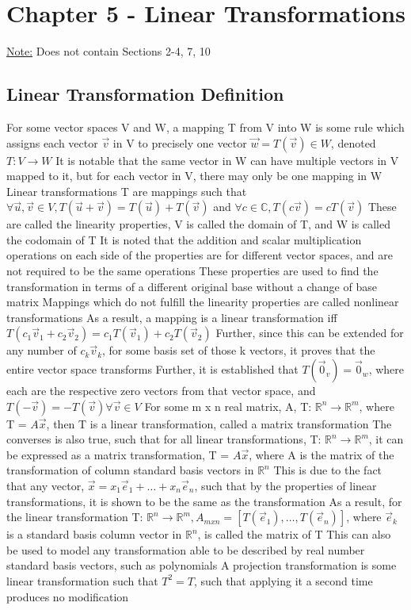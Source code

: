\documentclass[11 pt, twoside]{article}
\newenvironment{outline*}
{
	\begin{outline}[enumerate]
	}
	{\end{outline}
}
\begin{document}
\section{Chapter 5 - Linear Transformations}
\underline{Note:} Does not contain Sections 2-4, 7, 10
\subsection{Linear Transformation Definition}
\begin{outline*}
\1 For some vector spaces V and W, a mapping T from V into W is some rule which assigns each vector $\vec{v}$ in V to precisely one vector $\vec{w} = T(\vec{v}) \in W$, denoted $T: V \to W$
\2 It is notable that the same vector in W can have multiple vectors in V mapped to it, but for each vector in V, there may only be one mapping in W
\1 Linear transformations T are mappings such that $\forall \vec{u}, \vec{v} \in V, T(\vec{u} + \vec{v}) = T(\vec{u}) + T(\vec{v})$ and $\forall c \in \mathbb{C}, T(c\vec{v}) = cT(\vec{v})$
\2 These are called the linearity properties, V is called the domain of T, and W is called the codomain of T
\2 It is noted that the addition and scalar multiplication operations on each side of the properties are for different vector spaces, and are not required to be the same operations
\2 These properties are used to find the transformation in terms of a different original base without a change of base matrix
\2 Mappings which do not fulfill the linearity properties are called nonlinear transformations
\2 As a result, a mapping is a linear transformation iff $T(c_1\vec{v}_1 + c_2\vec{v}_2) = c_1T(\vec{v}_1) + c_2T(\vec{v}_2)$
\3 Further, since this can be extended for any number of $c_k\vec{v}_k$, for some basis set of those k vectors, it proves that the entire vector space transforms
\2 Further, it is established that $T(\vec{0}_v) = \vec{0}_w$, where each are the respective zero vectors from that vector space, and $T(-\vec{v}) = -T(\vec{v}) \forall \vec{v} \in V$
\1 For some m x n real matrix, A, T: $\mathbb{R}^n \to \mathbb{R}^m$, where T = $A\vec{x}$, then T is a linear transformation, called a matrix transformation
\2 The converses is also true, such that for all linear transformations, T: $\mathbb{R}^n \to \mathbb{R}^m$, it can be expressed as a matrix transformation, T = $A\vec{x}$, where A is the matrix of the transformation of column standard basis vectors in $\mathbb{R}^n$
\3 This is due to the fact that any vector, $\vec{x} = x_1\vec{e}_1 + \dots + x_n\vec{e}_n$, such that by the properties of linear transformations, it is shown to be the same as the transformation
\2 As a result, for the linear transformation T: $\mathbb{R}^n \to \mathbb{R}^m, A_{mxn} = [T(\vec{e}_1), \dots, T(\vec{e}_n)]$, where $\vec{e}_k$ is a standard basis column vector in $\mathbb{R}^n$, is called the matrix of T
\3 This can also be used to model any transformation able to be described by real number standard basis vectors, such as polynomials
\2 A projection transformation is some linear transformation such that $T^2 = T$, such that applying it a second time produces no modification
\end{outline*}
\end{document}
